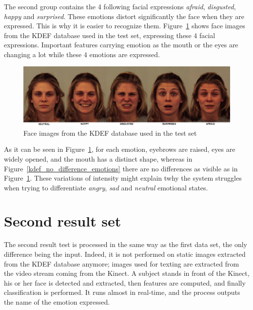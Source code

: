 \noindent The second group contains the 4 following facial expressions \textit{afraid}, \textit{disgusted}, \textit{happy} and \textit{surprised}. These emotions distort significantly the face when they are expressed. This is why it is easier to recognize them. Figure~\ref{kdef_difference_emotions} shows face images from the KDEF database used in the test set, expressing these 4 facial expressions. Important features carrying emotion as the mouth or the eyes are changing a lot while these 4 emotions are expressed.
\newline

\begin{figure}[!h]
\begin{center}
\noindent \includegraphics[scale=0.3]{figures/kdef_difference_emotions} 
\newline
\caption{Face images from the KDEF database used in the test set}
\label{kdef_difference_emotions}
\end{center} 
\end{figure}

\noindent As it can be seen in Figure~\ref{kdef_difference_emotions}, for each emotion, eyebrows are raised, eyes are widely opened, and the mouth has a distinct shape, whereas in Figure~\ref{kdef_no_difference_emotions} there are no differences as visible as in Figure~\ref{kdef_difference_emotions}. These variations of intensity might explain twhy the system struggles when trying to differentiate \textit{angry}, \textit{sad} and \textit{neutral} emotional states.
\newline

\section{Second result set}

\vspace{\baselineskip}
\noindent The second result test is processed in the same way as the first data set, the only difference being the input. Indeed, it is not performed on static images extracted from the KDEF database anymore; images used for texting are extracted from the video stream coming from the Kinect. A subject stands in front of the Kinect, his or her face is detected and extracted, then features are computed, and finally classification is performed. It runs almost in real-time, and the process outputs the name of the emotion expressed.
\newline

